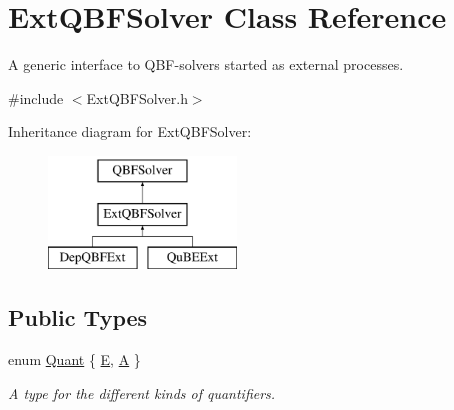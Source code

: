\hypertarget{classExtQBFSolver}{\section{Ext\-Q\-B\-F\-Solver Class Reference}
\label{classExtQBFSolver}
}


A generic interface to Q\-B\-F-\/solvers started as external processes.  




{\ttfamily \#include $<$Ext\-Q\-B\-F\-Solver.\-h$>$}

Inheritance diagram for Ext\-Q\-B\-F\-Solver\-:\begin{figure}[H]
\begin{center}
\leavevmode
\includegraphics[height=3.000000cm]{classExtQBFSolver}
\end{center}
\end{figure}
\subsection*{Public Types}
\begin{DoxyCompactItemize}
\item 
enum \hyperlink{classQBFSolver_ac091e263cb55286cc07b2451bcf4d3c7}{Quant} \{ \hyperlink{classQBFSolver_ac091e263cb55286cc07b2451bcf4d3c7a090ab4a5b262710ccd80e97d72f9a7b3}{E}, 
\hyperlink{classQBFSolver_ac091e263cb55286cc07b2451bcf4d3c7afd6518d5d985aa8346ac071e4c0d8ee0}{A}
 \}
\begin{DoxyCompactList}\small\item\em A type for the different kinds of quantifiers. \end{DoxyCompactList}\end{DoxyCompactItemize}
